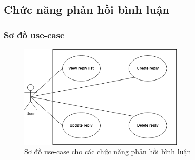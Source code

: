 \subsection{Chức năng phản hồi bình luận}
\subsubsection{Sơ đồ use-case}
\begin{figure}[H]
    \centering
    \includegraphics[width=0.7\textwidth]{Images/UseCase/Reply.png}
    \caption{Sơ đồ use-case cho các chức năng phản hồi bình luận}
\end{figure}
